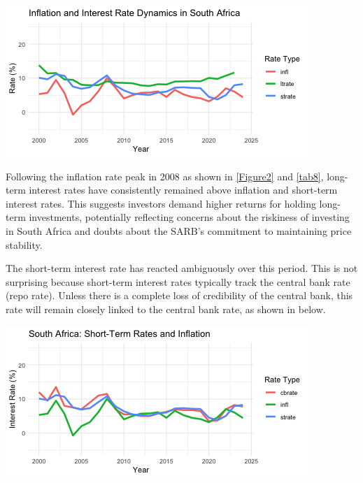 \documentclass[11pt,preprint]{elsarticle}
\let\origfigure\figure
\let\endorigfigure\endfigure
\renewenvironment{figure}[1][2] {
    \expandafter\origfigure\expandafter[H]
} {
    \endorigfigure
}
\numberwithin{equation}{section}
\numberwithin{figure}{section}
\numberwithin{table}{section}
\begin{document}
\begin{figure}[H]

{\centering \includegraphics{DatSci-Project-_files/figure-latex/Figure2-1} 

}

\caption{ Behaviour of Market-Related Rates\label{Figure2}}\label{fig:Figure2}
\end{figure}

Following the inflation rate peak in 2008 as shown in \ref{Figure2} and
\ref{tab8}, long-term interest rates have consistently remained above
inflation and short-term interest rates. This suggests investors demand
higher returns for holding long-term investments, potentially reflecting
concerns about the riskiness of investing in South Africa and doubts
about the SARB's commitment to maintaining price stability.

The short-term interest rate has reacted ambiguously over this period.
This is not surprising because short-term interest rates typically track
the central bank rate (repo rate). Unless there is a complete loss of
credibility of the central bank, this rate will remain closely linked to
the central bank rate, as shown in below.

\begin{figure}[H]

{\centering \includegraphics{DatSci-Project-_files/figure-latex/Figure3-1} 

}

\caption{Behvaiour of Short-Term Rates\label{Figure3}}\label{fig:Figure3}
\end{figure}
\end{document}
